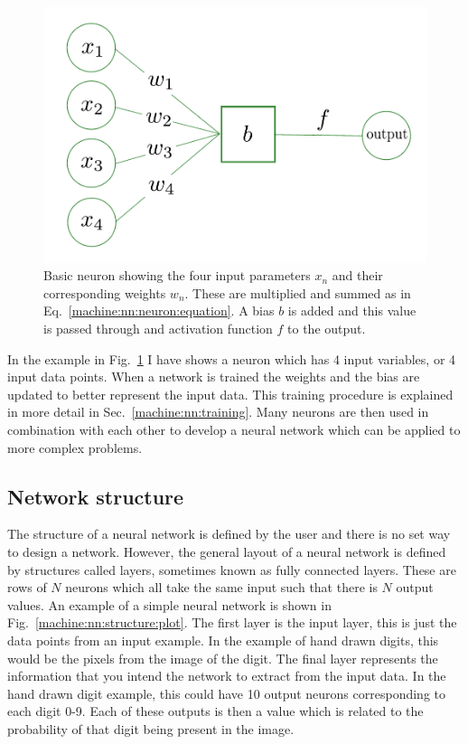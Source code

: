 \begin{figure}[ht]
    \centering
    \includegraphics[width=0.6\columnwidth]{C4_cnn/neuron.pdf}
    \caption[Basic neuron]{Basic neuron showing the four input parameters $x_n$ and their corresponding weights $w_n$. These are multiplied and summed as in Eq.~\ref{machine:nn:neuron:equation}. A bias $b$ is added and this value is passed through and activation function $f$ to the output.}
    \label{machine:nn:neuron:plot}
\end{figure}

In the example in Fig.~\ref{machine:nn:neuron:plot} I have shows a neuron which has 4 input variables, or 4 input data points. 
When a network is trained the weights and the bias are updated to better represent the input data.
This training procedure is explained in more detail in Sec.~\ref{machine:nn:training}.
Many neurons are then used in combination with each other to develop a neural network which can be applied to more complex problems.

\subsection{\label{machine:nn:structure}Network structure}

The structure of a neural network is defined by the user and there is no set way to design a network.
However, the general layout of a neural network is defined by structures called layers, sometimes known as fully connected layers. 
These are rows of $N$ neurons which all take the same input such that there is $N$ output values.
An example of a simple neural network is shown in Fig.~\ref{machine:nn:structure:plot}.
The first layer is the input layer, this is just the data points from an input example.
In the example of hand drawn digits, this would be the pixels from the image of the digit.
The final layer represents the information that you intend the network to extract from the input data. 
In the hand drawn digit example, this could have 10 output neurons corresponding to each digit 0-9. 
Each of these outputs is then a value which is related to the probability of that digit being present in the image.  

